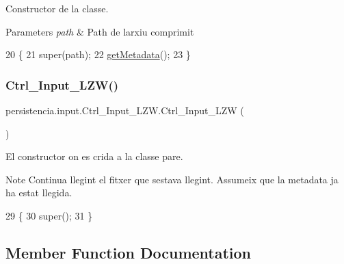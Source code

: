 Constructor de la classe. 


\begin{DoxyParams}{Parameters}
{\em path} & Path de l\textquotesingle{}arxiu comprimit \\
\hline
\end{DoxyParams}

\begin{DoxyCode}
20                                        \{
21         super(path);
22         \hyperlink{classpersistencia_1_1input_1_1Ctrl__Input_a46e05fce164a6803820c02565c1769c8}{getMetadata}();
23     \}
\end{DoxyCode}
\mbox{\label{classpersistencia_1_1input_1_1Ctrl__Input__LZW_a1b5319954e229993f11201438c72fe34}} 
\subsubsection{\texorpdfstring{Ctrl\+\_\+\+Input\+\_\+\+L\+Z\+W()}{Ctrl\_Input\_LZW()}\hspace{0.1cm}{\footnotesize\ttfamily [2/2]}}
{\footnotesize\ttfamily persistencia.\+input.\+Ctrl\+\_\+\+Input\+\_\+\+L\+Z\+W.\+Ctrl\+\_\+\+Input\+\_\+\+L\+ZW (\begin{DoxyParamCaption}{ }\end{DoxyParamCaption})\hspace{0.3cm}{\ttfamily [inline]}}



El constructor on es crida a la classe pare. 

\begin{DoxyNote}{Note}
Continua llegint el fitxer que s\textquotesingle{}estava llegint. Assumeix que la metadata ja ha estat llegida. 
\end{DoxyNote}

\begin{DoxyCode}
29                             \{
30         super();
31     \}
\end{DoxyCode}


\subsection{Member Function Documentation}
\mbox{\label{classpersistencia_1_1input_1_1Ctrl__Input__LZW_a821592197863ec1b1f052a794753ea40}} 
